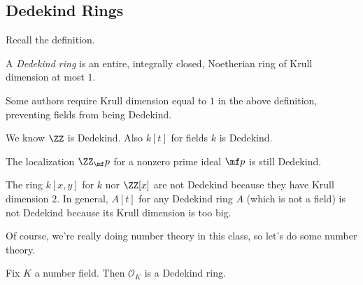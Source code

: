 \documentclass[../notes.tex]{subfiles}
\begin{document}
\subsection{Dedekind Rings}
Recall the definition.
\begin{defi}[Dedekind]
    A \textit{Dedekind ring} is an entire, integrally closed, Noetherian ring of Krull dimension at most $1.$
\end{defi}
\begin{warn}
    Some authors require Krull dimension equal to $1$ in the above definition, preventing fields from being Dedekind.
\end{warn}
\begin{ex}
    We know $\ZZ$ is Dedekind. Also $k[t]$ for fields $k$ is Dedekind.
\end{ex}
\begin{ex}
    The localization $\ZZ_\mf p$ for a nonzero prime ideal $\mf p$ is still Dedekind.
\end{ex}
\begin{nex}
    The ring $k[x,y]$ for $k$ nor $\ZZ[x]$ are not Dedekind because they have Krull dimension $2.$ In general, $A[t]$ for any Dedekind ring $A$ (which is not a field) is not Dedekind because its Krull dimension is too big.
\end{nex}
Of course, we're really doing number theory in this class, so let's do some number theory.
\begin{thm}
    Fix $K$ a number field. Then $\mathcal O_K$ is a Dedekind ring.
\end{thm}
\end{document}
